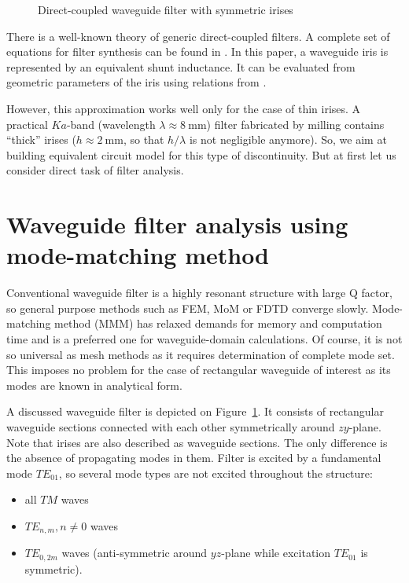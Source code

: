 \documentclass{pj}
\begin{document}
\begin{figure}[h]
  \centering
  
  \caption{Direct-coupled waveguide filter with symmetric irises}
  \label{fig:filter-drawing}
\end{figure}

There is a well-known theory of generic direct-coupled filters. A
complete set of equations for filter synthesis can be found in
\cite{cohn1957}. In this paper, a waveguide iris is represented by an
equivalent shunt inductance. It can be evaluated from geometric
parameters of the iris using relations from \cite{matthaei1980}.

However, this approximation works well only for the case of thin
irises. A practical $Ka$-band (wavelength
$\lambda \approx 8~\mathrm{mm}$) filter fabricated by milling contains
``thick'' irises ($h \approx 2~\mathrm{mm}$, so that $h/\lambda$ is not
negligible anymore). So, we aim at building equivalent circuit model
for this type of discontinuity. But at first let us consider direct
task of filter analysis.

\section{Waveguide filter analysis using mode-matching method}
\label{sec:mode-matching-method}

Conventional waveguide filter is a highly resonant structure with
large Q factor, so general purpose methods such as FEM, MoM or FDTD
converge slowly. Mode-matching method (MMM) has relaxed demands for
memory and computation time and is a preferred one for
waveguide-domain calculations. Of course, it is not so universal as
mesh methods as it requires determination of complete mode
set. This imposes no problem for the case of rectangular waveguide of
interest as its modes are known in analytical form.

A discussed waveguide filter is depicted on
Figure~\ref{fig:filter-drawing}. It consists of rectangular waveguide
sections connected with each other symmetrically around
$zy$-plane. Note that irises are also described as waveguide
sections. The only difference is the absence of propagating modes in
them. Filter is excited by a fundamental mode $TE_{01}$, so several
mode types are not excited throughout the structure:

\begin{itemize}
\item all $TM$ waves  
\item $TE_{n, m}, n \ne 0$ waves 
\item $TE_{0, 2m}$ waves (anti-symmetric around $yz$-plane while
  excitation $TE_{01}$ is symmetric).
\end{itemize}
\end{document}
